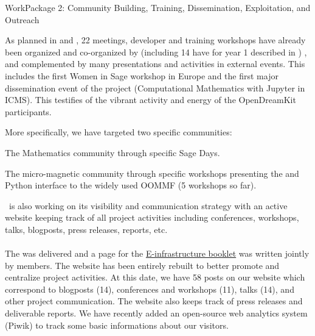 \documentclass{deliverablereport}
\makeatletter
\renewcommand\subsubsection{\@startsection{subsubsection}{2}%
  \z@{.5\linespacing\@plus.7\linespacing}{.1\linespacing}%
  {\normalfont\bfseries}}
\makeatother
\begin{document}
\clearpage
  \subsubsection{WorkPackage 2:  Community Building, Training, Dissemination, Exploitation, and Outreach}
\label{dissem}

  As planned in  and
  , 22 meetings, developer and training workshops have already
  been organized and co-organized by \ODK (including 14 have for year 1 described in ) , and complemented by many
  presentations and activities in external events. This includes the first Women in Sage workshop in Europe and the
  first major dissemination event of the project (Computational Mathematics with Jupyter in ICMS). This testifies
  of the vibrant activity and energy of the OpenDreamKit participants.
  
  More specifically, we have targeted two specific communities:

\begin{compactitem}
\item The Mathematics community through specific Sage Days.
\item The micro-magnetic community through specific workshops presenting
the \Jupyter and Python interface to the widely used OOMMF  (5 workshops so far).
\end{compactitem}  
  

  \ODK\ is also working on its visibility and communication strategy with an active website keeping track of all
  project activities including conferences, workshops, talks, blogposts, press releases, reports, etc.
  
\paragraph{}

The  was delivered and a page for the \href{https://github.com/OpenDreamKit/OpenDreamKit/blob/master/Communication/eInfra-Booklet/ODK.md}{E-infrastructure booklet} was written jointly by \ODK members. The website has been 
entirely rebuilt to better promote  and centralize project activities. At this date, 
we have 58 posts on our website which correspond to blogposts (14), conferences and workshops (11),
talks (14), and other project communication. The website also keeps track of press releases
and deliverable reports. We have recently added an open-source web analytics system (Piwik) 
to track some basic informations about our visitors.
\end{document}

